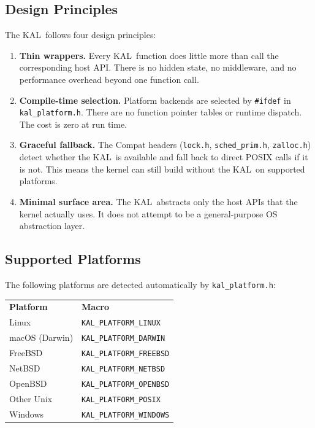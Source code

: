 \documentclass[11pt,twoside]{article}
\newcommand{\KAL}{KAL}
\begin{document}
\subsection{Design Principles}

The \KAL\ follows four design principles:

\begin{enumerate}
  \item {\bf Thin wrappers.}  Every \KAL\ function does little more
        than call the corresponding host API.  There is no hidden
        state, no middleware, and no performance overhead beyond one
        function call.

  \item {\bf Compile-time selection.}  Platform backends are selected
        by {\tt \#ifdef} in {\tt kal\_platform.h}.  There are no
        function pointer tables or runtime dispatch.  The cost is
        zero at run time.

  \item {\bf Graceful fallback.}  The Compat headers ({\tt lock.h},
        {\tt sched\_prim.h}, {\tt zalloc.h}) detect whether the \KAL\
        is available and fall back to direct POSIX calls if it is not.
        This means the kernel can still build without the \KAL\ on
        supported platforms.

  \item {\bf Minimal surface area.}  The \KAL\ abstracts only the
        host APIs that the kernel actually uses.  It does not attempt
        to be a general-purpose OS abstraction layer.
\end{enumerate}

\subsection{Supported Platforms}

The following platforms are detected automatically by
{\tt kal\_platform.h}:

\medskip
\noindent
\begin{tabularx}{\textwidth}{lX}
{\bf Platform}       & {\bf Macro} \\[2pt]
Linux                & {\tt KAL\_PLATFORM\_LINUX} \\
macOS (Darwin)       & {\tt KAL\_PLATFORM\_DARWIN} \\
FreeBSD              & {\tt KAL\_PLATFORM\_FREEBSD} \\
NetBSD               & {\tt KAL\_PLATFORM\_NETBSD} \\
OpenBSD              & {\tt KAL\_PLATFORM\_OPENBSD} \\
Other Unix           & {\tt KAL\_PLATFORM\_POSIX} \\
Windows              & {\tt KAL\_PLATFORM\_WINDOWS} \\
\end{tabularx}
\end{document}
